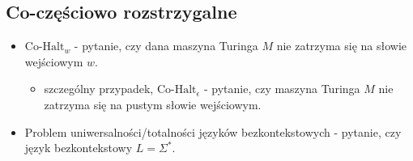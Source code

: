 \documentclass{article}
\theoremstyle{definition}
\theoremstyle{remark}
\begin{document}
\newpage

\subsection{Co-częściowo rozstrzygalne}
\begin{itemize}
    \item $\text{Co-Halt}_w$ - pytanie, czy dana maszyna Turinga $M$ nie zatrzyma się na słowie wejściowym $w$.
    \begin{itemize}
        \item szczególny przypadek, $\text{Co-Halt}_{\epsilon}$ - pytanie, czy maszyna Turinga $M$ nie zatrzyma się na pustym słowie wejściowym.
    \end{itemize}
    \item Problem uniwersalności/totalności języków bezkontekstowych - pytanie, czy język bezkontekstowy $L = \Sigma^*$.
\end{itemize}
\end{document}

